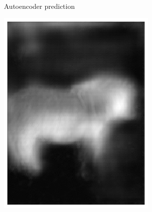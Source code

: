 \documentclass{l4proj}
\begin{document}
\begin{figure}[ht]
\begin{subfigure}[h!]{0.25\textwidth}
    \caption{Autoencoder prediction}
  \end{subfigure}
  \begin{subfigure}[h!]{0.25\textwidth}
    \includegraphics[width=\textwidth]{images/unet/pony_predicted.png}

\end{subfigure}
\end{figure}
\end{document}
